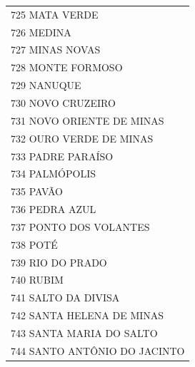 \documentclass{article}
\begin{document}
\begin{longtable}[c]{m{18cm}}
\multicolumn{1}{l}{ \hspace{2em} 725 MATA VERDE } \\
\multicolumn{1}{l}{ \hspace{2em} 726 MEDINA } \\
\multicolumn{1}{l}{ \hspace{2em} 727 MINAS NOVAS } \\
\multicolumn{1}{l}{ \hspace{2em} 728 MONTE FORMOSO } \\
\multicolumn{1}{l}{ \hspace{2em} 729 NANUQUE } \\
\multicolumn{1}{l}{ \hspace{2em} 730 NOVO CRUZEIRO } \\
\multicolumn{1}{l}{ \hspace{2em} 731 NOVO ORIENTE DE MINAS } \\
\multicolumn{1}{l}{ \hspace{2em} 732 OURO VERDE DE MINAS } \\
\multicolumn{1}{l}{ \hspace{2em} 733 PADRE PARAÍSO } \\
\multicolumn{1}{l}{ \hspace{2em} 734 PALMÓPOLIS } \\
\multicolumn{1}{l}{ \hspace{2em} 735 PAVÃO } \\
\multicolumn{1}{l}{ \hspace{2em} 736 PEDRA AZUL } \\
\multicolumn{1}{l}{ \hspace{2em} 737 PONTO DOS VOLANTES } \\
\multicolumn{1}{l}{ \hspace{2em} 738 POTÉ } \\
\multicolumn{1}{l}{ \hspace{2em} 739 RIO DO PRADO } \\
\multicolumn{1}{l}{ \hspace{2em} 740 RUBIM } \\
\multicolumn{1}{l}{ \hspace{2em} 741 SALTO DA DIVISA } \\
\multicolumn{1}{l}{ \hspace{2em} 742 SANTA HELENA DE MINAS } \\
\multicolumn{1}{l}{ \hspace{2em} 743 SANTA MARIA DO SALTO } \\
\multicolumn{1}{l}{ \hspace{2em} 744 SANTO ANTÔNIO DO JACINTO } \\

\end{longtable}
\end{document}
